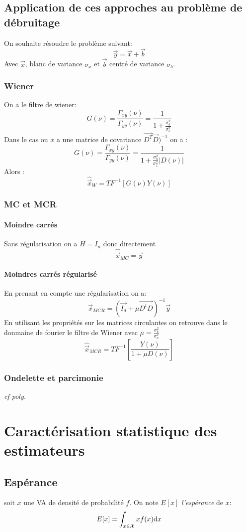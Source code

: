 \documentclass[main.tex]{subfiles}
\begin{document}
\subsection{Application de ces approches au problème de débruitage}
On souhaite résoudre le problème suivant:
\[
\vec{y} =\vec{x}+\vec{b}
\]
Avec $\vec{x}$, blanc de variance $\sigma_x$ et $\vec{b}$ centré de
variance $\sigma_b$.
\subsubsection{Wiener}
On a le filtre de wiener:
\[
  G(\nu) = \frac{\Gamma_{xy}(\nu)}{\Gamma_{yy}(\nu)} = \frac{1}{1+\frac{\sigma_b^2}{\sigma_x^2}}
\]
Dans le cas ou $x$ a une matrice de covariance $\vec{D^T}\vec{D})^{-1}$ on a :
\[
G(\nu) = \frac{\Gamma_{xy}(\nu)}{\Gamma_{yy}(\nu)} = \frac{1}{1+\frac{\sigma_b^2}{\sigma_x^2}|D(\nu)|}    
\]
Alors :
\[
\boxed{\hat{\vec{x}}_{W} =TF^{-1}[G(\nu)Y(\nu)]}
\]
\subsubsection{MC et MCR}
\paragraph{Moindre carrés} Sans régularisation on a $H= I_n$ donc directement
\[
\boxed{\hat{\vec{x}}_{MC} = \vec{y}}
\]

\paragraph{Moindres carrés régularisé} En prenant en compte une
régularisation on a:
\[
  \boxed{\vec{x}_{MCR} = (\vec{I_d}+\mu\vec{D^tD})^{-1}\vec{y}
  }
\]
En utilisant les propriétés sur les matrices circulantes on retrouve
dans le donmaine de fourier le filtre de Wiener avec $\mu=\frac{\sigma_b^2}{\sigma_x^2}$
\[
\boxed{\hat{\vec{x}}_{MCR} =TF^{-1}\left[\frac{Y(\nu)}{1+\mu D(\nu)}\right]}
\]
\subsubsection{Ondelette et parcimonie }
\emph{cf poly.}
\section{Caractérisation statistique des estimateurs}
\subsection{Espérance}
\begin{defin}
  soit $x$ une VA de densité de probabilité $f$. On note $E[x]$
  \emph{l'espérance} de $x$:
  \[
    E[x] = \int_{x\in\mathcal{X}}^{}xf(x)\mbox{d} x
  \]
\end{defin}
\end{document}
